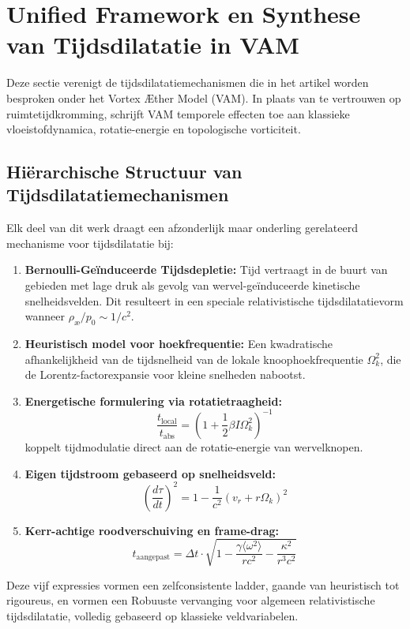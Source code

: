 \section{Unified Framework en Synthese van Tijdsdilatatie in VAM}

Deze sectie verenigt de tijdsdilatatiemechanismen die in het artikel worden besproken onder het Vortex Æther Model (VAM). In plaats van te vertrouwen op ruimtetijdkromming, schrijft VAM temporele effecten toe aan klassieke vloeistofdynamica, rotatie-energie en topologische vorticiteit.

\subsection{Hiërarchische Structuur van Tijdsdilatatiemechanismen}

Elk deel van dit werk draagt een afzonderlijk maar onderling gerelateerd mechanisme voor tijdsdilatatie bij:

\begin{enumerate}
\item \textbf{Bernoulli-Geïnduceerde Tijdsdepletie:} Tijd vertraagt in de buurt van gebieden met lage druk als gevolg van wervel-geïnduceerde kinetische snelheidsvelden. Dit resulteert in een speciale relativistische tijdsdilatatievorm wanneer \( \rho_{\text{\ae}} / p_0 \sim 1/c^2 \).
\item \textbf{Heuristisch model voor hoekfrequentie:} Een kwadratische afhankelijkheid van de tijdsnelheid van de lokale knoophoekfrequentie \( \Omega_k^2 \), die de Lorentz-factorexpansie voor kleine snelheden nabootst.
\item \textbf{Energetische formulering via rotatietraagheid:}
\[
\boxed{\frac{t_{\text{local}}}{t_{\text{abs}}} = \left(1 + \frac{1}{2} \beta I \Omega_k^2 \right)^{-1}}
\]
koppelt tijdmodulatie direct aan de rotatie-energie van wervelknopen. \item \textbf{Eigen tijdstroom gebaseerd op snelheidsveld:}
\[
\boxed{\left( \frac{d\tau}{dt} \right)^2 = 1 - \frac{1}{c^2}(v_r + r\Omega_k)^2}
\]
\item \textbf{Kerr-achtige roodverschuiving en frame-drag:}
\[
\boxed{t_{\text{aangepast}} = \Delta t \cdot \sqrt{1 - \frac{\gamma \langle \omega^2 \rangle}{rc^2} - \frac{\kappa^2}{r^3c^2}}}
\]
\end{enumerate}

Deze vijf expressies vormen een zelfconsistente ladder, gaande van heuristisch tot rigoureus, en vormen een Robuuste vervanging voor algemeen relativistische tijdsdilatatie, volledig gebaseerd op klassieke veldvariabelen.

